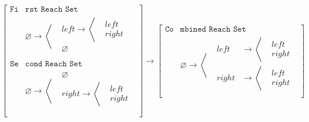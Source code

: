 \begin{equation}\label{eq:mergeTreeFunctionExample}
    \left[
    \begin{aligned}
    \texttt{Fi}&\texttt{rst Reach Set}\\
        &\varnothing \to 
            \left<
                \begin{aligned}
                    &left \to \left<
                                \begin{aligned}
                                    &left\\
                                    &right
                                \end{aligned}
                              \right.\\
                    &\varnothing\\
                \end{aligned}
             \right.\\ 
    \texttt{Se}&\texttt{cond Reach Set}\\
        &\varnothing \to 
            \left<
                \begin{aligned}
                    & \varnothing \\
                    & right \to \left< 
                                    \begin{aligned}
                                        &left\\
                                        &right
                                    \end{aligned}
                                \right.\\
                \end{aligned}
            \right.\\
    \end{aligned}
    \right]
    \to
    \left[
    \begin{aligned}
    \texttt{Co}&\texttt{mbined Reach Set}\\
    &\varnothing\to
        \left< 
            \begin{aligned}
                &left &\to   \left< 
                                \begin{aligned}
                                    &left\\
                                    &right
                                \end{aligned}    
                            \right.\\
                &right &\to   \left< 
                                \begin{aligned}
                                    &left\\
                                    &right
                                \end{aligned}    
                            \right.\\
            \end{aligned}    
        \right.
    \end{aligned}
    \right]
\end{equation}

